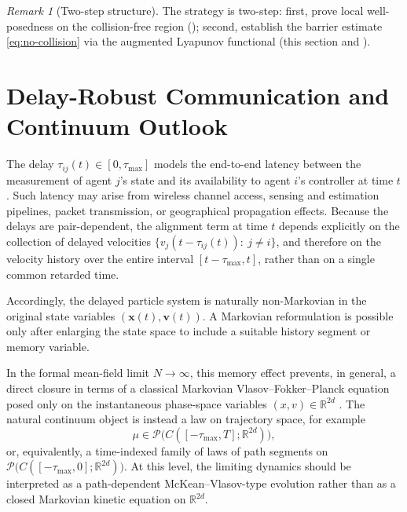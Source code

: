 \documentclass[pdflatex,sn-mathphys-num]{sn-jnl}%
\numberwithin{equation}{section}
\theoremstyle{thmstyleone}%
\theoremstyle{remark}
\newtheorem{remark}{Remark}
\theoremstyle{definition}
\newcommand{\R}{\mathbb{R}}
\newcommand{\calP}{\mathcal{P}}
\begin{document}
\begin{remark}[Two-step structure]
\label{rem:two-step-redux}
The strategy is two-step: first, prove local well-posedness on the
collision-free region (); second, establish the barrier
estimate \eqref{eq:no-collision} via the augmented Lyapunov functional
(this section and ).
\end{remark}
\section{Delay-Robust Communication and Continuum Outlook}
\label{sec:continuum}
The delay $\tau_{ij}(t)\in[0,\tau_{\max}]$ models the end-to-end latency
between the measurement of agent $j$'s state and its availability to
agent $i$'s controller at time $t$. Such latency may arise from wireless
channel access, sensing and estimation pipelines, packet transmission, or
geographical propagation effects. Because the delays are pair-dependent,
the alignment term at time $t$ depends explicitly on the collection of
delayed velocities $\{v_j(t-\tau_{ij}(t)):\ j\neq i\}$, and therefore on
the velocity history over the entire interval $[t-\tau_{\max},t]$, rather
than on a single common retarded time.

Accordingly, the delayed particle system is naturally non-Markovian in the
original state variables $(\mathbf{x}(t),\mathbf{v}(t))$. A Markovian reformulation is
possible only after enlarging the state space to include a suitable
history segment or memory variable.

In the formal mean-field limit $N\to\infty$, this memory effect prevents,
in general, a direct closure in terms of a classical Markovian
Vlasov--Fokker--Planck equation posed only on the instantaneous phase-space
variables $(x,v)\in\R^{2d}$
\cite{ha2008particle,carrillo2010asymptotic}. The natural continuum object
is instead a law on trajectory space, for example
\begin{equation}\label{eq:path-measure}
  \mu \in \calP\bigl(C([-\tau_{\max},T];\R^{2d})\bigr),
\end{equation}
or, equivalently, a time-indexed family of laws of path segments on
$\calP\bigl(C([-\tau_{\max},0];\R^{2d})\bigr)$. At this level, the limiting
dynamics should be interpreted as a path-dependent McKean--Vlasov-type
evolution \cite{carmona2018probabilistic,lacker2020convergence} rather than
as a closed Markovian kinetic equation on $\R^{2d}$.
\end{document}
